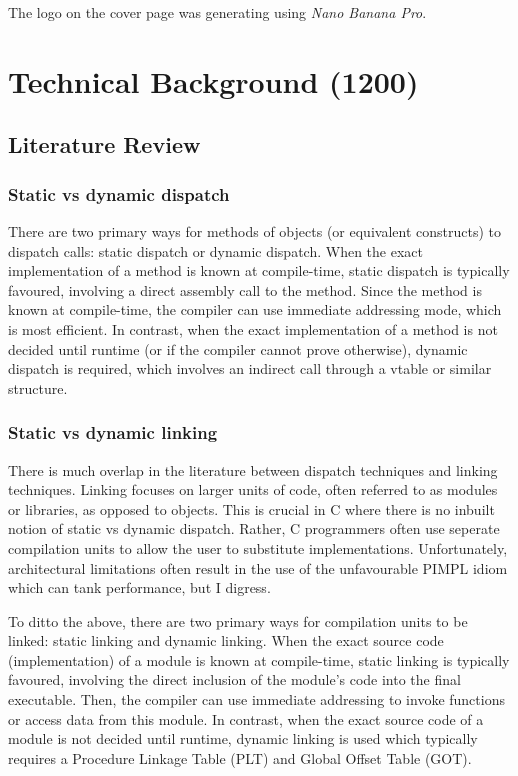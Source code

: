 \documentclass[12pt,a4paper,twoside]{report}
\begin{document}
The logo on the cover page was generating using \textit{Nano Banana Pro}.

\chapter{Technical Background (1200)}

\section{Literature Review}

\subsection{Static vs dynamic dispatch}

There are two primary ways for methods of objects (or equivalent constructs) to dispatch calls: static dispatch or dynamic dispatch. When the exact implementation of a method is known at compile-time, static dispatch is typically favoured, involving a direct assembly call to the method. Since the method is known at compile-time, the compiler can use immediate addressing mode, which is most efficient. In contrast, when the exact implementation of a method is not decided until runtime (or if the compiler cannot prove otherwise), dynamic dispatch is required, which involves an indirect call through a vtable or similar structure.

\subsection{Static vs dynamic linking}

There is much overlap in the literature between dispatch techniques and linking techniques. Linking focuses on larger units of code, often referred to as modules or libraries, as opposed to objects. This is crucial in C where there is no inbuilt notion of static vs dynamic dispatch. Rather, C programmers often use seperate compilation units to allow the user to substitute implementations. Unfortunately, architectural limitations often result in the use of the unfavourable PIMPL idiom which can tank performance, but I digress.

To ditto the above, there are two primary ways for compilation units to be linked: static linking and dynamic linking. When the exact source code (implementation) of a module is known at compile-time, static linking is typically favoured, involving the direct inclusion of the module's code into the final executable. Then, the compiler can use immediate addressing to invoke functions or access data from this module. In contrast, when the exact source code of a module is not decided until runtime, dynamic linking is used which typically requires a Procedure Linkage Table (PLT) and Global Offset Table (GOT).
\end{document}
